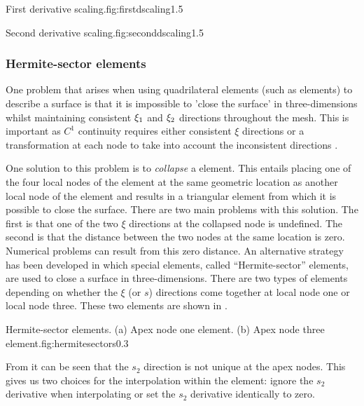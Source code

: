 {First derivative scaling.}{fig:firstdscaling}{1.5}

{Second derivative scaling.}{fig:seconddscaling}{1.5}


\subsubsection{Hermite-sector elements}
\label{sec:hselements}

One problem that arises when using quadrilateral elements (such as
\bicubicherm elements) to describe a surface is that it is impossible to
'close the surface' in three-dimensions whilst maintaining consistent $\xi_{1}$
and $\xi_{2}$ directions throughout the mesh. This is important as $C^{1}$
continuity requires either consistent $\xi$ directions or a transformation at
each node to take into account the inconsistent directions \cite{petera:1994}.

One solution to this problem is to \emph{collapse} a \bicubicherm element.
This entails placing one of the four local nodes of the element at the same
geometric location as another local node of the element and results in a
triangular element from which it is possible to close the surface. There are
two main problems with this solution.  The first is that one of the two $\xi$
directions at the collapsed node is undefined.  The second is that the
distance between the two nodes at the same location is zero.  Numerical
problems can result from this zero distance.  An alternative strategy has
been developed in which special elements, called ``Hermite-sector''
elements, are used to close a \bicubicherm
surface in three-dimensions. There are two types of elements depending on
whether the $\xi$ (or $s$) directions come together at local node one or local
node three.  These two elements are shown in .

{Hermite-sector elements. (a) Apex node one element. (b) Apex node three
  element.}{fig:hermitesectors}{0.3}

From  it can be seen that the $s_{2}$ direction is
not unique at the apex nodes. This gives us two choices for the interpolation
within the element: ignore the $s_{2}$ derivative when interpolating or set
the $s_{2}$ derivative identically to zero.

